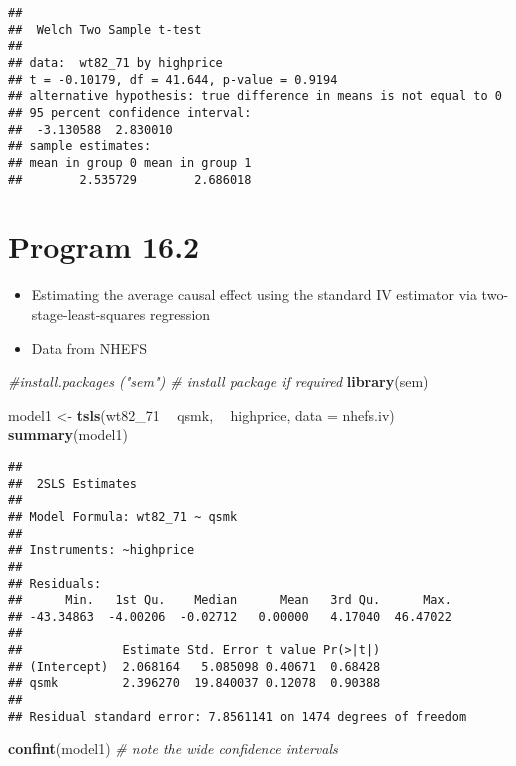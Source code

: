 \documentclass[
  10pt,
]{book}
\newenvironment{Shaded}{\begin{snugshade}}{\end{snugshade}}
\newcommand{\CommentTok}[1]{\textcolor[rgb]{0.56,0.35,0.01}{\textit{#1}}}
\newcommand{\DataTypeTok}[1]{\textcolor[rgb]{0.13,0.29,0.53}{#1}}
\newcommand{\DecValTok}[1]{\textcolor[rgb]{0.00,0.00,0.81}{#1}}
\newcommand{\KeywordTok}[1]{\textcolor[rgb]{0.13,0.29,0.53}{\textbf{#1}}}
\newcommand{\NormalTok}[1]{#1}
\newcommand{\OperatorTok}[1]{\textcolor[rgb]{0.81,0.36,0.00}{\textbf{#1}}}
\newcommand{\StringTok}[1]{\textcolor[rgb]{0.31,0.60,0.02}{#1}}
\providecommand{\tightlist}{%
  \setlength{\itemsep}{0pt}\setlength{\parskip}{0pt}}
\begin{document}
\begin{verbatim}
## 
##  Welch Two Sample t-test
## 
## data:  wt82_71 by highprice
## t = -0.10179, df = 41.644, p-value = 0.9194
## alternative hypothesis: true difference in means is not equal to 0
## 95 percent confidence interval:
##  -3.130588  2.830010
## sample estimates:
## mean in group 0 mean in group 1 
##        2.535729        2.686018
\end{verbatim}

\hypertarget{program-16.2}{%
\section{Program 16.2}\label{program-16.2}}

\begin{itemize}
\tightlist
\item
  Estimating the average causal effect using the standard IV estimator via two-stage-least-squares regression
\item
  Data from NHEFS
\end{itemize}

\begin{Shaded}
\begin{Highlighting}[]
\CommentTok{#install.packages ("sem") # install package if required}
\KeywordTok{library}\NormalTok{(sem) }

\NormalTok{model1 <-}\StringTok{ }\KeywordTok{tsls}\NormalTok{(wt82_}\DecValTok{71} \OperatorTok{~}\StringTok{ }\NormalTok{qsmk, }\OperatorTok{~}\StringTok{ }\NormalTok{highprice, }\DataTypeTok{data =}\NormalTok{ nhefs.iv)}
\KeywordTok{summary}\NormalTok{(model1)}
\end{Highlighting}
\end{Shaded}

\begin{verbatim}
## 
##  2SLS Estimates
## 
## Model Formula: wt82_71 ~ qsmk
## 
## Instruments: ~highprice
## 
## Residuals:
##      Min.   1st Qu.    Median      Mean   3rd Qu.      Max. 
## -43.34863  -4.00206  -0.02712   0.00000   4.17040  46.47022 
## 
##              Estimate Std. Error t value Pr(>|t|)
## (Intercept)  2.068164   5.085098 0.40671  0.68428
## qsmk         2.396270  19.840037 0.12078  0.90388
## 
## Residual standard error: 7.8561141 on 1474 degrees of freedom
\end{verbatim}

\begin{Shaded}
\begin{Highlighting}[]
\KeywordTok{confint}\NormalTok{(model1)  }\CommentTok{# note the wide confidence intervals}
\end{Highlighting}
\end{Shaded}
\end{document}

